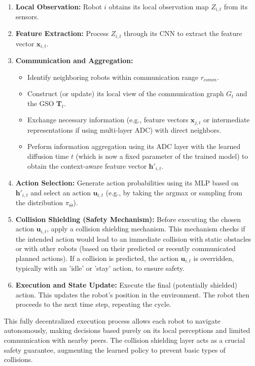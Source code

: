 \begin{enumerate}
    \item \textbf{Local Observation:} Robot $i$ obtains its local observation map $Z_{i,t}$ from its sensors.
    \item \textbf{Feature Extraction:} Process $Z_{i,t}$ through its CNN to extract the feature vector $\mathbf{x}_{i,t}$.
    \item \textbf{Communication and Aggregation:}
        \begin{itemize}
            \item Identify neighboring robots within communication range $r_{comm}$.
            \item Construct (or update) its local view of the communication graph $G_t$ and the GSO $\mathbf{T}_t$.
            \item Exchange necessary information (e.g., feature vectors $\mathbf{x}_{j,t}$ or intermediate representations if using multi-layer ADC) with direct neighbors.
            \item Perform information aggregation using its ADC layer with the learned diffusion time $t$ (which is now a fixed parameter of the trained model) to obtain the context-aware feature vector $\mathbf{h}'_{i,t}$.
        \end{itemize}
    \item \textbf{Action Selection:} Generate action probabilities using its MLP based on $\mathbf{h}'_{i,t}$ and select an action $\mathbf{u}_{i,t}$ (e.g., by taking the argmax or sampling from the distribution $\pi_{\Theta}$).
    \item \textbf{Collision Shielding (Safety Mechanism):} Before executing the chosen action $\mathbf{u}_{i,t}$, apply a collision shielding mechanism. This mechanism checks if the intended action would lead to an immediate collision with static obstacles or with other robots (based on their predicted or recently communicated planned actions). If a collision is predicted, the action $\mathbf{u}_{i,t}$ is overridden, typically with an 'idle' or 'stay' action, to ensure safety.
    \item \textbf{Execution and State Update:} Execute the final (potentially shielded) action. This updates the robot's position in the environment. The robot then proceeds to the next time step, repeating the cycle.
\end{enumerate}

This fully decentralized execution process allows each robot to navigate autonomously, making decisions based purely on its local perceptions and limited communication with nearby peers. The collision shielding layer acts as a crucial safety guarantee, augmenting the learned policy to prevent basic types of collisions.

